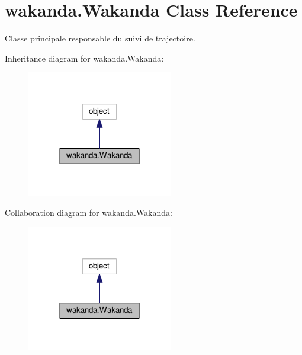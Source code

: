 \hypertarget{classwakanda_1_1Wakanda}{}\section{wakanda.\+Wakanda Class Reference}
\label{classwakanda_1_1Wakanda}


Classe principale responsable du suivi de trajectoire.  




Inheritance diagram for wakanda.\+Wakanda\+:
\nopagebreak
\begin{figure}[H]
\begin{center}
\leavevmode
\includegraphics[width=180pt]{classwakanda_1_1Wakanda__inherit__graph}
\end{center}
\end{figure}


Collaboration diagram for wakanda.\+Wakanda\+:
\nopagebreak
\begin{figure}[H]
\begin{center}
\leavevmode
\includegraphics[width=180pt]{classwakanda_1_1Wakanda__coll__graph}
\end{center}
\end{figure}
